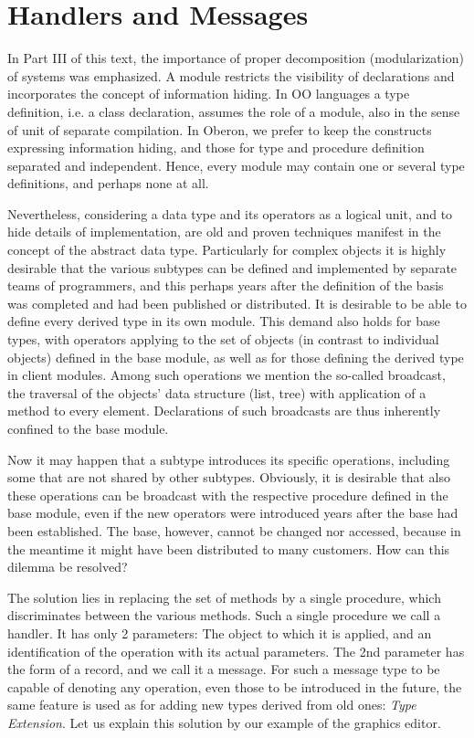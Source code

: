 \section{Handlers and Messages}
In Part III of this text, the importance of proper decomposition (modularization) of systems was
emphasized. A module restricts the visibility of declarations and incorporates the concept of
information hiding. In OO languages a type definition, i.e. a class declaration, assumes the role of a
module, also in the sense of unit of separate compilation. In Oberon, we prefer to keep the constructs
expressing information hiding, and those for type and procedure definition separated and independent.
Hence, every module may contain one or several type definitions, and perhaps none at all.

Nevertheless, considering a data type and its operators as a logical unit, and to hide details of
implementation, are old and proven techniques manifest in the concept of the abstract data type.
Particularly for complex objects it is highly desirable that the various subtypes can be defined and
implemented by separate teams of programmers, and this perhaps years after the definition of the basis
was completed and had been published or distributed. It is desirable to be able to define every derived
type in its own module. This demand also holds for base types, with operators applying to the set of
objects (in contrast to individual objects) defined in the base module, as well as for those defining
the derived type in client modules. Among such operations we mention the so-called broadcast, the
traversal of the objects’ data structure (list, tree) with application of a method to every element.
Declarations of such broadcasts are thus inherently confined to the base module.

Now it may happen that a subtype introduces its specific operations, including some that are not
shared by other subtypes. Obviously, it is desirable that also these operations can be broadcast with
the respective procedure defined in the base module, even if the new operators were introduced years
after the base had been established. The base, however, cannot be changed nor accessed, because in the
meantime it might have been distributed to many customers. How can this dilemma be resolved?

The solution lies in replacing the set of methods by a single procedure, which discriminates between
the various methods. Such a single procedure we call a handler. It has only 2 parameters: The object
to which it is applied, and an identification of the operation with its actual parameters. The 2nd
parameter has the form of a record, and we call it a message. For such a message type to be capable of
denoting any operation, even those to be introduced in the future, the same feature is used as for
adding new types derived from old ones: \emph{Type Extension}. Let us explain this solution by our
example of the graphics editor.


